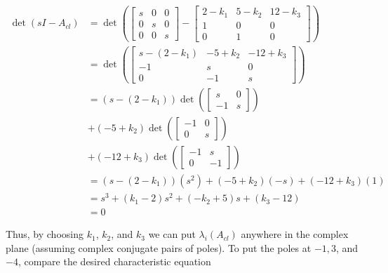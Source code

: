 \documentclass[main.tex]{subfiles}
\begin{document}
\begin{enumerate}
\begin{enumerate}
        $$
        \begin{aligned}
        \operatorname{det}\left(s I-A_{c l}\right) &= \operatorname{det}\left(\left[\begin{array}{ccc}
        s & 0 & 0 \\
        0 & s & 0 \\
        0 & 0 & s
        \end{array}\right] - \left[\begin{array}{ccc}
        2-k_1 & 5-k_2 & 12-k_3 \\
        1 & 0 & 0 \\
        0 & 1 & 0
        \end{array}\right] \right)\\
        &=\operatorname{det}\left(\left[\begin{array}{ccc}
        s-\left(2-k_1\right) & -5+k_2 & -12+k_3 \\
        -1 & s & 0 \\
        0 & -1 & s
        \end{array}\right]\right) \\
        &=\left(s-\left(2-k_1\right)\right) \operatorname{det}\left(\left[\begin{array}{cc}
        s & 0 \\
        -1 & s
        \end{array}\right]\right)\\
        &+\left(-5+k_2\right) \operatorname{det}\left(\left[\begin{array}{cc}
        -1 & 0 \\
        0 & s
        \end{array}\right]\right)\\
        &+\left(-12+k_3\right) \operatorname{det}\left(\left[\begin{array}{cc}
        -1 & s \\
        0 & -1
        \end{array}\right]\right) \\
        &= \left(s-\left(2-k_1\right)\right)\left(s^2\right)+\left(-5+k_2\right)(-s)+\left(-12+k_3\right)(1)\\
        &= s^3 + (k_1-2)s^2 + (-k_2 + 5)s + (k_3 - 12)\\
        & = 0
        \end{aligned}
        $$
        
        Thus, by choosing $k_1$, $k_2$, and $k_3$ we can put $\lambda_i\left(A_{c l}\right)$ anywhere in the complex plane (assuming complex conjugate pairs of poles). To put the poles at $-1, 3$, and $-4$, compare the desired characteristic equation
        

\end{enumerate}
\end{enumerate}
\end{document}
